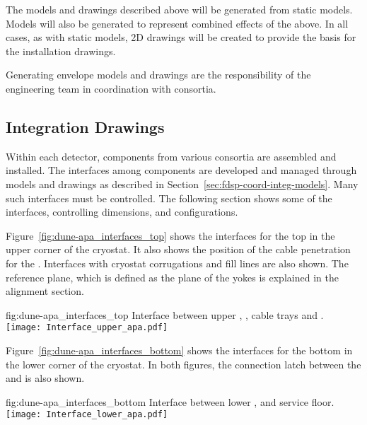 The models and drawings described above will be generated from static
models. Models will also be generated to
represent combined effects of the above. In all cases, as with static models, 2D
drawings will be created to provide the basis for the installation
drawings.


Generating envelope models and drawings are the responsibility of the
 engineering team in coordination with consortia.


\subsection{Integration Drawings}
\label{sec:fdsp-coord-integ-drawings}

Within each detector, components from various consortia are assembled
and installed. The interfaces among components are developed and
managed through models and drawings as described in
Section~\ref{sec:fdsp-coord-integ-models}. Many such interfaces must
be controlled. The following section shows some of the interfaces,
controlling dimensions, and configurations.


Figure~\ref{fig:dune-apa_interfaces_top} shows the interfaces for the
top  in the upper corner of the cryostat. It also shows the position
of the cable penetration for the . Interfaces with cryostat
corrugations and  fill lines are also shown. The reference plane,
which is defined as the plane of the  yokes is explained in the
alignment section.
\begin{dunefigure}{fig:dune-apa_interfaces_top}
  {Interface between upper , , cable
    trays and .}
  \texttt{[image: Interface\_upper\_apa.pdf]}
\end{dunefigure}


Figure~\ref{fig:dune-apa_interfaces_bottom} shows the interfaces for
the bottom  in the lower corner of the cryostat. In both figures,
the connection latch between the  and  is also
shown.
\begin{dunefigure}{fig:dune-apa_interfaces_bottom}
  {Interface between lower ,  and 
    service floor.}
  \texttt{[image: Interface\_lower\_apa.pdf]}
\end{dunefigure}


